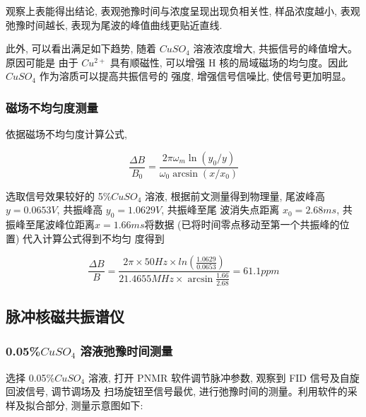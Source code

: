 \documentclass[12pt,a4paper]{article}
\newcommand{\be}[1]{
    \begin{equation}
        #1
    \end{equation}
}
\begin{document}
    观察上表能得出结论, 表观弛豫时间与浓度呈现出现负相关性, 样品浓度越小, 表观弛豫时间越长, 表现为尾波的峰值曲线更贴近直线.

此外, 可以看出满足如下趋势, 随着 $CuS O_4$ 溶液浓度增大, 共振信号的峰值增大。原因可能是
由于 $Cu^{2+}$ 具有顺磁性, 可以增强 H 核的局域磁场的均匀度。因此 $CuS O_4$ 作为溶质可以提高共振信号的
强度, 增强信号信噪比, 使信号更加明显。

\subsubsection{磁场不均匀度测量}
依据磁场不均匀度计算公式, 
\be{\frac{\Delta B}{B_{0}}=\frac{2 \pi \omega_{m} \ln \left(y_{0} / y\right)}{\omega_{0} \arcsin \left(x / x_{0}\right)}}
选取信号效果较好的 5\%$CuS O_4$ 溶液, 根据前文测量得到物理量, 尾波峰高$y=0.0653V$, 共振峰高 $y_0 = 1.0629V$, 共振峰至尾
波消失点距离 $x_0 = 2.68ms$, 共振峰至尾波峰位距离$x=1.66ms$将数据 (已将时间零点移动至第一个共振峰的位置) 代入计算公式得到不均匀
度得到

\be{\frac{\Delta B}{B}=\frac{2\pi\times 50Hz\times ln(\frac{1.0629}{0.0653})}{21.4655MHz\times \arcsin{\frac{1.66}{2.68}}}=61.1ppm}

\subsection{脉冲核磁共振谱仪}
\subsubsection{0.05\%$CuSO_4$ 溶液弛豫时间测量}
选择 0.05\%$CuS O_4$ 溶液, 打开 PNMR 软件调节脉冲参数, 观察到 FID 信号及自旋回波信号, 调节调场及
扫场旋钮至信号最优, 进行弛豫时间的测量。利用软件的采样及拟合部分, 测量示意图如下:
\end{document}
